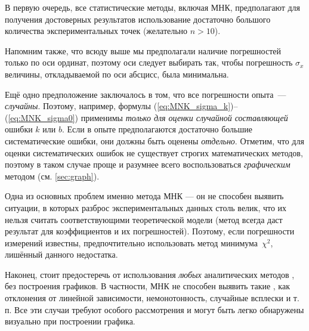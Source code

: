 В первую очередь, все статистические методы, включая МНК,
предполагают для получения достоверных результатов использование достаточно большого количества экспериментальных точек (желательно $n>10$). 

Напомним также, что всюду выше мы предполагали наличие погрешностей только по оси ординат, поэтому оси следует выбирать так, чтобы погрешность $\sigma_{x}$ величины, откладываемой по оси абсцисс, была минимальна.

Ещё одно предположение заключалось в том, что все погрешности опыта~---
\emph{случайны}. Поэтому, например, формулы (\ref{eq:MNK_sigma_k})--(\ref{eq:MNK_sigma0})
применимы \emph{только для оценки случайной составляющей} ошибки $k$
или $b$. Если в опыте предполагаются достаточно большие систематические
ошибки, они должны быть оценены \emph{отдельно}. Отметим, что для
оценки систематических ошибок не существует строгих математических
методов, поэтому в таком случае проще и разумнее всего воспользоваться
\emph{графическим} методом (см. \ref{sec:graph}).

Одна из основных проблем именно метода МНК --- он не способен выявить ситуации, в которых разброс экспериментальных данных столь велик, что их нельзя считать соответствующими теоретической модели (метод всегда даст 
результат для коэффициентов и их погрешностей). Поэтому, если погрешности измерений известны, предпочтительно использовать метод минимума~$\chi^2$, лишённый данного недостатка.




Наконец, стоит предостеречь от использования \emph{любых} аналитических
методов , без построения графиков. В частности, МНК не способен
выявить такие , как отклонения от линейной зависимости,
немонотонность, случайные всплески и т.\,п. Все эти случаи требуют особого
рассмотрения и могут быть легко обнаружены визуально при построении графика.




